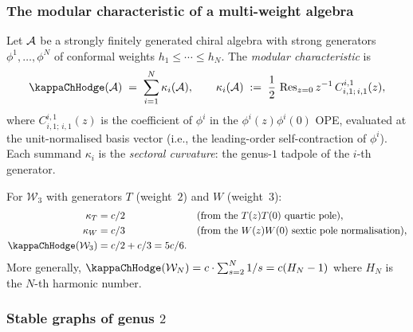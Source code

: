 \subsubsection{The modular characteristic of a multi-weight algebra}

\begin{definition}
\label{def:kappa-hessian-trace}
Let $\mathcal{A}$ be a strongly finitely generated chiral algebra with
strong generators $\phi^1, \ldots, \phi^N$ of conformal weights
$h_1 \leq \cdots \leq h_N$. The \emph{modular characteristic} is
\begin{equation}\label{eq:kappa-hessian}
\kappaChHodge(\cA) \;=\; \sum_{i=1}^N \kappa_i(\cA),
\qquad
\kappa_i(\cA) \;:=\; \frac{1}{2}\,
\Res_{z=0} z^{-1}\, C^{i,1}_{i,1;\,i,1}(z),
\end{equation}
where $C^{i,1}_{i,1;\,i,1}(z)$ is the coefficient of $\phi^i$ in the
$\phi^i(z)\phi^i(0)$ OPE, evaluated at the unit-normalised
basis vector (i.e., the leading-order
self-contraction of $\phi^i$). Each summand $\kappa_i$ is the
\emph{sectoral curvature}: the genus-$1$ tadpole of the $i$-th
generator.
\end{definition}

\begin{example}[$\mathcal{W}_3$]
\label{ex:kappa-w3}
For $\mathcal{W}_3$ with generators $T$ (weight~$2$) and $W$
(weight~$3$):
\begin{align}
\kappa_T &= c/2 &&\text{(from the $T(z)T(0)$ quartic pole)},
\label{eq:kappa-T}\\
\kappa_W &= c/3 &&\text{(from the $W(z)W(0)$ sextic pole
normalisation)}, \label{eq:kappa-W}\\
\kappaChHodge(\mathcal{W}_3) &= c/2 + c/3 = 5c/6.
\label{eq:kappa-w3}
\end{align}
More generally, $\kappaChHodge(\mathcal{W}_N) = c \cdot
\sum_{s=2}^N 1/s = c(H_N - 1)$ where $H_N$ is the $N$-th
harmonic number.
\end{example}

\subsubsection{Stable graphs of genus $2$}

